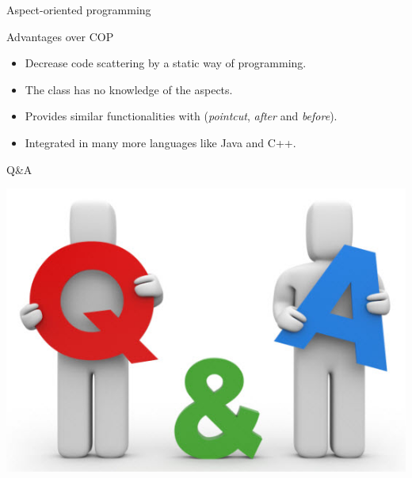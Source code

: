 \documentclass[presentation]{beamer}
\begin{document}
\begin{frame}[label={sec:orgf60373f}]{Aspect-oriented programming}
\begin{block}{Advantages over COP}
\begin{itemize}
\item Decrease code scattering by a static way of programming.
\item The class has no knowledge of the aspects.
\item Provides similar functionalities with (\emph{pointcut}, \emph{after} and \emph{before}).
\item Integrated in many more languages like Java and C++.
\end{itemize}
\end{block}
\end{frame}

\begin{frame}[label={sec:org2e4cac1}]{Q\&A}
\begin{center}
\includegraphics[width=.9\linewidth]{./qa.jpg}
\end{center} 
\end{frame}
\end{document}

